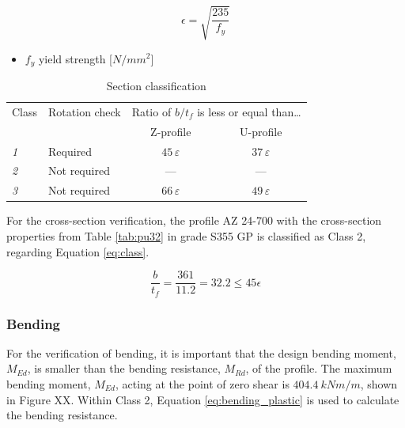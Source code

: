 \begin{equation}
    \epsilon = \sqrt{\frac{235}{f_{y}}}
    \label{eq:epsilon}
\end{equation}

\begin{itemize}
    \item $f_{y}$   yield strength [$N/mm^{2}$]
\end{itemize}

\begin{table}[H]
  \centering
  \small
  \setlength{\tabcolsep}{8pt}
  \renewcommand{\arraystretch}{1.15}
  \caption{Section classification}
  \label{tab:section_classification}
  \begin{tabular}{@{}l l c c@{}}
    \toprule
    \multicolumn{1}{l}{Class} &
    \multicolumn{1}{l}{Rotation check} &
    \multicolumn{2}{c}{Ratio of $b/t_f$ is less or equal than\ldots} \\
    \cmidrule(lr){3-4}
    & & Z-profile & U-profile \\
    \midrule
    \textit{1} & Required     & $45\,\varepsilon$ & $37\,\varepsilon$ \\
    \textit{2} & Not required & ---               & ---               \\
    \textit{3} & Not required & $66\,\varepsilon$ & $49\,\varepsilon$ \\
    \bottomrule
  \end{tabular}
\end{table}

For the cross-section verification, the profile AZ 24-700 with the cross-section properties from Table \ref{tab:pu32} in grade S355 GP is classified as Class 2, regarding Equation \ref{eq:class}.

\begin{equation}
    \frac{b}{t_{f}} = \frac{361}{11.2} = 32.2 \leq 45 \epsilon 
    \label{eq:class}
\end{equation}

\subsubsection{Bending}

For the verification of bending, it is important that the design bending moment, $M_{Ed}$, is smaller than the bending resistance, $M_{Rd}$, of the profile. The maximum bending moment, $M_{Ed}$, acting at the point of zero shear is $404.4 \ kNm/m$, shown in Figure XX. Within Class 2, Equation \ref{eq:bending_plastic} is used to calculate the bending resistance.

